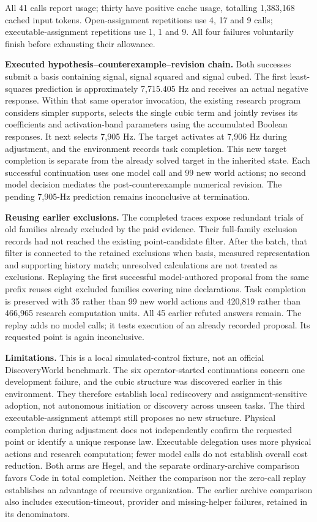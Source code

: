 \documentclass[twoside,11pt]{article}
\begin{document}
All 41 calls report usage; thirty have positive cache usage, totalling 1,383,168 cached input tokens. Open-assignment repetitions use 4, 17 and 9 calls; executable-assignment repetitions use 1, 1 and 9. All four failures voluntarily finish before exhausting their allowance.


\textbf{Executed hypothesis–counterexample–revision chain.} Both successes submit a basis containing signal, signal squared and signal cubed. The first least-squares prediction is approximately 7,715.405 Hz and receives an actual negative response. Within that same operator invocation, the existing research program considers simpler supports, selects the single cubic term and jointly revises its coefficients and activation-band parameters using the accumulated Boolean responses. It next selects 7,905 Hz. The target activates at 7,906 Hz during adjustment, and the environment records task completion. This new target completion is separate from the already solved target in the inherited state. Each successful continuation uses one model call and 99 new world actions; no second model decision mediates the post-counterexample numerical revision. The pending 7,905-Hz prediction remains inconclusive at termination.


\textbf{Reusing earlier exclusions.} The completed traces expose redundant trials of old families already excluded by the paid evidence. Their full-family exclusion records had not reached the existing point-candidate filter. After the batch, that filter is connected to the retained exclusions when basis, measured representation and supporting history match; unresolved calculations are not treated as exclusions. Replaying the first successful model-authored proposal from the same prefix reuses eight excluded families covering nine declarations. Task completion is preserved with 35 rather than 99 new world actions and 420,819 rather than 466,965 research computation units. All 45 earlier refuted answers remain. The replay adds no model calls; it tests execution of an already recorded proposal. Its requested point is again inconclusive.


\textbf{Limitations.} This is a local simulated-control fixture, not an official DiscoveryWorld benchmark. The six operator-started continuations concern one development failure, and the cubic structure was discovered earlier in this environment. They therefore establish local rediscovery and assignment-sensitive adoption, not autonomous initiation or discovery across unseen tasks. The third executable-assignment attempt still proposes no new structure. Physical completion during adjustment does not independently confirm the requested point or identify a unique response law. Executable delegation uses more physical actions and research computation; fewer model calls do not establish overall cost reduction. Both arms are Hegel, and the separate ordinary-archive comparison favors Code in total completion. Neither the comparison nor the zero-call replay establishes an advantage of recursive organization. The earlier archive comparison also includes execution-timeout, provider and missing-helper failures, retained in its denominators.
\end{document}
